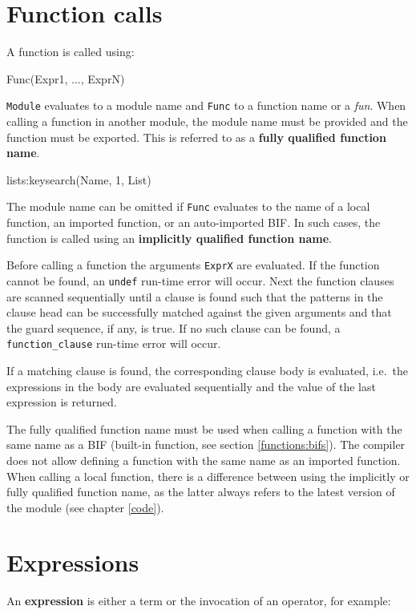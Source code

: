 \newpage
\section{Function calls}
A function is called using:

\begin{erlang}
[Module:]Func(Expr1, ..., ExprN)
\end{erlang}

\texttt{Module} evaluates to a module name and \texttt{Func} to
a function name or a \textit{fun}. When calling a function in another
module, the module name must be provided and the function must be
exported. This is referred to as a \textbf{fully qualified function name}.

\begin{erlang}
lists:keysearch(Name, 1, List)
\end{erlang}

The module name can be omitted if \texttt{Func} evaluates to the name
of a local function, an imported function, or an auto-imported
BIF.  In such cases, the function is called using an \textbf{implicitly qualified function name}.

Before calling a function the arguments \texttt{ExprX} are
evaluated.  If the function cannot be found, an \texttt{undef} run-time
error will occur. Next the function clauses are scanned sequentially
until a clause is found such that the patterns in the clause head can
be successfully matched against the given arguments and that the guard
sequence, if any, is true. If no such clause can be found, a
\texttt{function\_clause} run-time error will occur.

If a matching clause is found, the corresponding clause body is evaluated,
i.e.~the expressions in the body are evaluated sequentially and the
value of the last expression is returned.

The fully qualified function name must be used when calling a function
with the same name as a BIF (built-in function, see section
\ref{functions:bifs}). The compiler does not allow defining a function
with the same name as an imported function. When calling a local
function, there is a difference between using the implicitly or fully
qualified function name, as the latter always refers to the latest
version of the module (see chapter \ref{code}).


\section{Expressions}
\label{functions:expressions}
An \textbf{expression} is either a term or the invocation of an
operator, for example:

